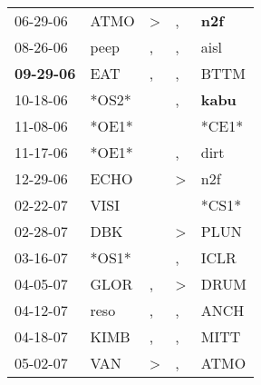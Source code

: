 \begin{supertabular}{p{0.07\textwidth}p{0.06\textwidth}p{0.02\textwidth}p{0.02\textwidth}p{0.06\textwidth}}
          06-29-06\textsuperscript{} &           ATMO\textsuperscript{} &     \textgreater &                , &   \textbf{n2f\textsuperscript{}} \\
          08-26-06\textsuperscript{} &           peep\textsuperscript{} &                , &                , &           aisl\textsuperscript{} \\
 \textbf{09-29-06\textsuperscript{}} &            EAT\textsuperscript{} &                , &                , &           BTTM\textsuperscript{} \\
          10-18-06\textsuperscript{} &                            *OS2* &                  &                , &  \textbf{kabu\textsuperscript{}} \\
          11-08-06\textsuperscript{} &                            *OE1* &                  &                  &                            *CE1* \\
          11-17-06\textsuperscript{} &                            *OE1* &                  &                , &           dirt\textsuperscript{} \\
          12-29-06\textsuperscript{} &           ECHO\textsuperscript{} &                  &     \textgreater &            n2f\textsuperscript{} \\
          02-22-07\textsuperscript{} &           VISI\textsuperscript{} &                  &                  &                            *CS1* \\
          02-28-07\textsuperscript{} &            DBK\textsuperscript{} &                  &     \textgreater &           PLUN\textsuperscript{} \\
          03-16-07\textsuperscript{} &                            *OS1* &                  &                , &           ICLR\textsuperscript{} \\
          04-05-07\textsuperscript{} &           GLOR\textsuperscript{} &                , &     \textgreater &           DRUM\textsuperscript{} \\
          04-12-07\textsuperscript{} &           reso\textsuperscript{} &                , &                , &           ANCH\textsuperscript{} \\
          04-18-07\textsuperscript{} &           KIMB\textsuperscript{} &                , &                , &           MITT\textsuperscript{} \\
          05-02-07\textsuperscript{} &            VAN\textsuperscript{} &     \textgreater &                , &           ATMO\textsuperscript{} \\

\end{supertabular}
